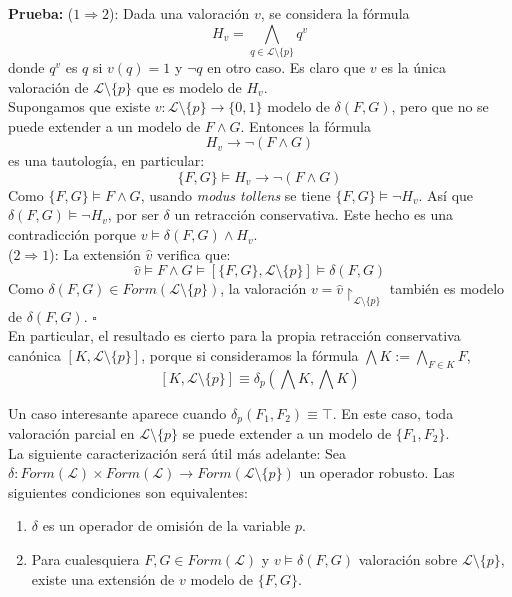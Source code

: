 \noindent \textbf{Prueba: } ($1 \Rightarrow 2$): Dada una valoración $v$, se considera la fórmula 
$$H_v = \bigwedge_{q \in \mathcal{L} \setminus \{ p \}} q^v$$
donde $q^v$ es $q$ si $v(q)=1$ y $\neg q$ en otro caso. Es claro que $v$ es la única valoración de $\mathcal{L} \setminus \{ p \}$ que es modelo de $H_v$. \\
Supongamos que existe $v  :\mathcal{L} \setminus \{p\} \rightarrow \{ 0,1 \}$ modelo de $\delta (F,G)$, pero que no se puede extender a un modelo de $F \wedge G$. Entonces la fórmula $$H_v \rightarrow \neg (F \wedge G)$$ es una tautología, en particular:
$$ \{ F,G \} \vDash H_v \rightarrow \neg (F \wedge G)$$
Como $ \{ F,G \} \vDash F \wedge G$, usando \textit{modus tollens} se tiene $\{ F,G \} \vDash \neg H_v$. Así que $\delta (F,G) \vDash \neg H_v$, por ser $\delta$ un retracción conservativa. Este hecho es una contradicción porque $v \vDash \delta (F,G) \wedge H_v$.\\
($2 \Rightarrow 1$): La extensión $\hat{v}$ verifica que:
$$\hat{v} \vDash F \wedge G \vDash [\{ F,G \} , \mathcal{L} \setminus \{ p \} ] \vDash \delta (F,G)$$
Como $\delta (F,G) \in Form(\mathcal{L} \setminus \{ p \})$, la valoración $v = \hat{v} \upharpoonright_{\mathcal{L} \setminus \{ p \}}$ también es modelo de $\delta (F,G)$. \hspace{14cm} $\square$ \\

En particular, el resultado es cierto para la propia retracción conservativa canónica $[K, \mathcal{L} \setminus \{ p \}]$, porque si consideramos la fórmula $\bigwedge K := \bigwedge_{F \in K} F$,
$$[K, \mathcal{L} \setminus \{ p \}] \equiv \delta_p (\bigwedge K , \bigwedge K)$$

Un caso interesante aparece cuando $\delta_p(F_1,F_2) \equiv \top$. En este caso, toda valoración parcial en $\mathcal{L} \setminus \{ p \}$ se puede extender a un modelo de $\{ F_1,F_2 \}$.\\

La siguiente caracterización será útil más adelante:
\cor Sea $\delta : Form(\mathcal{L}) \times Form(\mathcal{L}) \longrightarrow Form(\mathcal{L} \setminus \{ p \})$ un operador robusto. Las siguientes condiciones son equivalentes:
\begin{enumerate}
\item $\delta$ es un operador de omisión de la variable $p$.
\item Para cualesquiera $F,G \in Form(\mathcal{L})$ y $v \vDash \delta (F,G) $ valoración sobre $\mathcal{L} \setminus \{ p \}$, existe una extensión de $v$ modelo de $\{ F,G \}$.
\end{enumerate}

